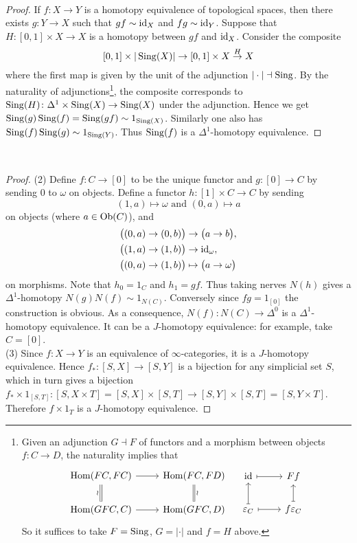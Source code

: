 \documentclass[a4paper,11pt,openany]{scrartcl}
\begin{document}
~\\
\begin{proof}
If $f\colon X\to Y$ is a homotopy equivalence of topological spaces, then there exists $g\colon Y\to X$ such that $gf\sim\operatorname{id}_X$ and $fg\sim\operatorname{id}_Y$. Suppose that $H\colon[0,1]\times X\to X$ is a homotopy between $gf$ and $\operatorname{id}_X$. Consider the composite
\[
[0,1]\times|\operatorname{Sing}(X)|\to[0,1]\times X\overset{H}{\to}X
\]
where the first map is given by the unit of the adjunction $|\cdot|\dashv\operatorname{Sing}$. By the naturality of adjunctions\footnote{Given an adjunction $G\dashv F$ of functors and a morphism between objects $f\colon C\to D$, the naturality implies that 
$$
\begin{tikzcd}[ampersand replacement=\&]
\Hom(FC,FC)\arrow[r]\arrow[d,equal,"\wr"']\& \Hom(FC,FD)\arrow[d,equal,"\wr"]\\
\Hom(GFC,C)\arrow[r]\& \Hom(GFC,D)
\end{tikzcd}\quad
\begin{tikzcd}[ampersand replacement=\&]
\id\arrow[r,mapsto]\& Ff\\
\varepsilon_C\arrow[r,mapsto]\arrow[u,mapsto]\& f\varepsilon_C\arrow[u,mapsto]
\end{tikzcd}
$$ So it suffices to take $F=\operatorname{Sing}$, $G=|\cdot|$ and $f=H$ above.}, the composite corresponds to $\operatorname{Sing}(H)\colon\Delta^1\times\operatorname{Sing}(X)\to\operatorname{Sing}(X)$ under the adjunction. Hence we get $\operatorname{Sing}(g)\operatorname{Sing}(f)=\operatorname{Sing}(gf)\sim 1_{\operatorname{Sing}(X)}$. Similarly one also has $\operatorname{Sing}(f)\operatorname{Sing}(g)\sim 1_{\operatorname{Sing}(Y)}$. Thus $\operatorname{Sing}(f)$ is a $\Delta^1$-homotopy equivalence.
\end{proof}
\ \\
\begin{proof}
(2) Define $f\colon C\to[0]$ to be the unique functor and $g\colon[0]\to C$ by sending $0$ to $\omega$ on objects. Define a functor $h\colon[1]\times C\to C$ by sending 
\[
(1,a)\mapsto\omega\text{ and }(0,a)\mapsto a
\]
on objects (where $a\in\operatorname{Ob}(C)$), and 
\begin{align*}
&\big((0,a)\to(0,b)\big)\to\big(a\to b\big),\\
&\big((1,a)\to(1,b)\big)\to\operatorname{id}_\omega,\\
&\big((0,a)\to(1,b)\big)\mapsto\big(a\to\omega\big)
\end{align*} on morphisms. Note that $h_0=1_C$ and $h_1=gf$. Thus taking nerves $N(h)$ gives a $\Delta^1$-homotopy $N(g)N(f)\sim 1_{N(C)}$. Conversely since $fg=1_{[0]}$ the construction is obvious. As a consequence, $N(f)\colon N(C)\to\Delta^0$ is a $\Delta^1$-homotopy equivalence. It can be a $J$-homotopy equivalence: for example, take $C=[0]$.\\

(3) Since $f\colon X\to Y$ is an equivalence of $\infty$-categories, it is a $J$-homotopy equivalence. Hence $f_*\colon[S,X]\to[S,Y]$ is a bijection for any simplicial set $S$, which in turn gives a bijection $f_*\times 1_{[S,T]}\colon[S,X\times T]=[S,X]\times[S,T]\to[S,Y]\times[S,T]=[S,Y\times T]$. Therefore $f\times 1_T$ is a $J$-homotopy equivalence.
\end{proof}
\end{document}
